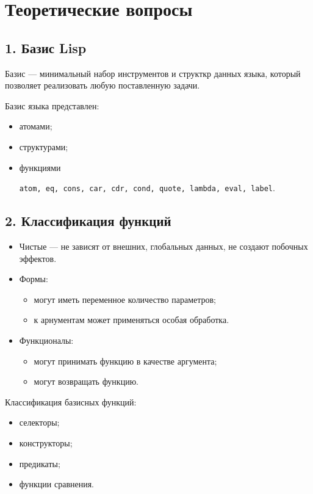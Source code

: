 \section*{Теоретические вопросы}

\subsection*{1. Базис Lisp}

Базис --- минимальный набор инструментов и структкр данных языка, который
позволяет реализовать любую поставленную задачи.

Базис языка представлен:
\begin{itemize}
    \item атомами;
    \item структурами;
    \item функциями

    \verb|atom, eq, cons, car, cdr, cond, quote, lambda, eval, label|.
\end{itemize}

\subsection*{2. Классификация функций}

\begin{itemize}
    \item Чистые --- не зависят от внешних, глобальных данных, не создают
          побочных эффектов.
    \item Формы:
        \begin{itemize}
            \item могут иметь переменное количество параметров;
            \item к арнументам может применяться особая обработка.
        \end{itemize}
    \item Функционалы:
        \begin{itemize}
            \item могут принимать функцию в качестве аргумента;
            \item могут возвращать функцию.
        \end{itemize}
\end{itemize}

Классификация базисных функций:
\begin{itemize}
    \item селекторы;
    \item конструкторы;
    \item предикаты;
    \item функции сравнения.
\end{itemize}

